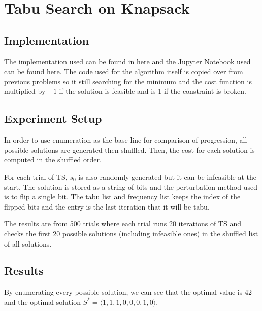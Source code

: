 \section{Tabu Search on Knapsack}

\subsection{Implementation}

The implementation used can be found in \href{https://github.com/nngerncham/ma395_heuristic/blob/main/homework/hw3/codebase/tabu_search/p5.py}{here} and the Jupyter Notebook used can be found \href{https://github.com/nngerncham/ma395_heuristic/blob/main/homework/hw3/codebase/Notebooks/Problem\%205.ipynb}{here}. The code used for the algorithm itself is copied over from previous problems so it still searching for the minimum and the cost function is multiplied by \(-1\) if the solution is feasible and is 1 if the constraint is broken.

\subsection{Experiment Setup}

In order to use enumeration as the base line for comparison of progression, all possible solutions are generated then shuffled. Then, the cost for each solution is computed in the shuffled order. 

For each trial of TS, \(s_0\) is also randomly generated but it can be infeasible at the start. The solution is stored as a string of bits and the perturbation method used is to flip a single bit. The tabu list and frequency list keeps the index of the flipped bits and the entry is the last iteration that it will be tabu.

The results are from 500 trials where each trial runs 20 iterations of TS and checks the first 20 possible solutions (including infeasible ones) in the shuffled list of all solutions.

\subsection{Results}

By enumerating every possible solution, we can see that the optimal value is 42 and the optimal solution \(S^* = \langle 1, 1, 1, 0, 0, 0, 1, 0 \rangle\).

